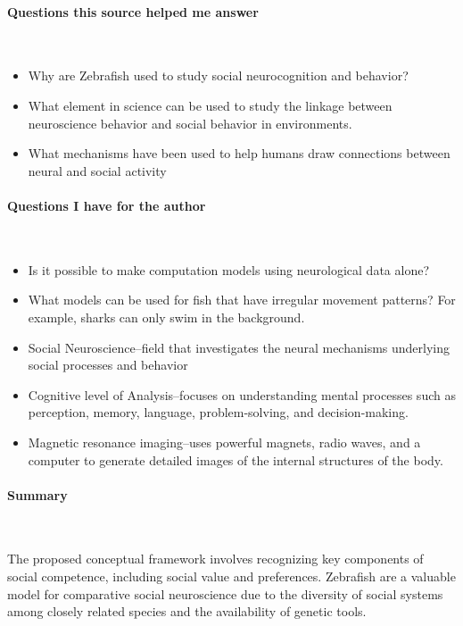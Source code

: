 \paragraph{Questions this source helped me answer} \

\begin{itemize}
    \item Why are Zebrafish used to study social neurocognition and behavior?
    \item What element in science can be used to study the linkage between neuroscience behavior and social behavior in environments. 
    \item What mechanisms have been used to help humans draw connections between neural and social activity 
\end{itemize}

\vspace*{-0.5cm}
\paragraph{Questions I have for the author} \ 

\begin{itemize}
    \item Is it possible to make computation models using neurological data alone?
    \item What models can be used for fish that have irregular movement patterns? For example, sharks can only swim in the background. 
    \item Social Neuroscience--field that investigates the neural mechanisms underlying social processes and behavior 
    \item Cognitive level of Analysis--focuses on understanding mental processes such as perception, memory, language, problem-solving, and decision-making. 
    \item Magnetic resonance imaging--uses powerful magnets, radio waves, and a computer to generate detailed images of the internal structures of the body.
\end{itemize}

\vspace*{-0.5cm}
\paragraph{Summary} \

The proposed conceptual framework involves recognizing key components of social competence, including social value and preferences. Zebrafish are a valuable model for comparative social neuroscience due to the diversity of social systems among closely related species and the availability of genetic tools. 

